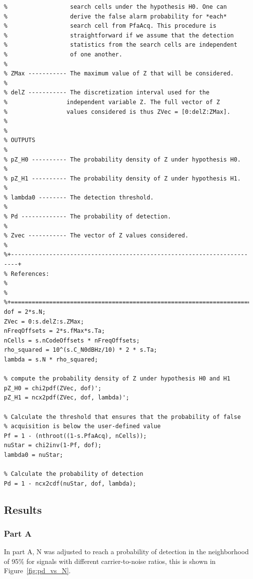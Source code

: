 \begin{lstlisting}
%                  search cells under the hypothesis H0. One can
%                  derive the false alarm probability for *each*
%                  search cell from PfaAcq. This procedure is
%                  straightforward if we assume that the detection
%                  statistics from the search cells are independent
%                  of one another.
%
% ZMax ----------- The maximum value of Z that will be considered.
%
% delZ ----------- The discretization interval used for the
%                 independent variable Z. The full vector of Z
%                 values considered is thus ZVec = [0:delZ:ZMax].
%
%
% OUTPUTS
%
% pZ_H0 ---------- The probability density of Z under hypothesis H0.
%
% pZ_H1 ---------- The probability density of Z under hypothesis H1.
%
% lambda0 -------- The detection threshold.
%
% Pd ------------- The probability of detection.
%
% Zvec ----------- The vector of Z values considered.
%
%+------------------------------------------------------------------------+
% References:
%
%
%+========================================================================+
dof = 2*s.N;
ZVec = 0:s.delZ:s.ZMax;
nFreqOffsets = 2*s.fMax*s.Ta;
nCells = s.nCodeOffsets * nFreqOffsets;
rho_squared = 10^(s.C_N0dBHz/10) * 2 * s.Ta;
lambda = s.N * rho_squared;

% compute the probability density of Z under hypothesis H0 and H1
pZ_H0 = chi2pdf(ZVec, dof)';
pZ_H1 = ncx2pdf(ZVec, dof, lambda)';

% Calculate the threshold that ensures that the probability of false 
% acquisition is below the user-defined value
Pf = 1 - (nthroot((1-s.PfaAcq), nCells));
nuStar = chi2inv(1-Pf, dof);
lambda0 = nuStar;

% Calculate the probability of detection
Pd = 1 - ncx2cdf(nuStar, dof, lambda);
\end{lstlisting}


\subsection{Results}

\subsubsection{Part A}

In part A, N was adjusted to reach a probability of detection in the neighborhood
of 95\% for signals with different carrier-to-noise ratios, this is shown in
Figure~\ref{fig:pd_vs_N}.

